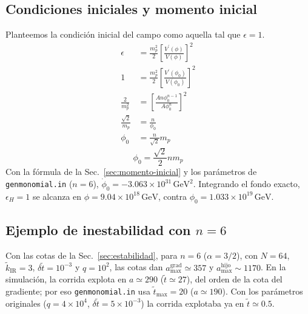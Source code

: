         \subsection{Condiciones iniciales y momento inicial}

            Planteemos la condición inicial del campo como aquella tal que $\epsilon = 1$.
            \begin{equation*}
                \begin{split}
                    \epsilon &= \frac{m_p^2}{2} \left[ \frac{V^\prime (\phi)}{V(\phi)} \right]^2\\
                    1 &= \frac{m_p^2}{2} \left[ \frac{V^\prime (\phi_0)}{V(\phi_0)} \right]^2\\
                    \frac{2}{m_p^2} &= \left[ \frac{A n \phi^{n-1}_0}{A \phi^n_0} \right]^2\\
                    \frac{\sqrt{2}}{m_p} &= \frac{n}{\phi_0}\\
                    \phi_0 &= \frac{n}{\sqrt{2}} m_p
                \end{split}
            \end{equation*}
            \begin{equation}
                \phi_0 = \frac{\sqrt{2}}{2} n m_p
            \end{equation}
            Con la fórmula de la Sec.~\ref{sec:momento-inicial} y los parámetros de \texttt{genmonomial.in} ($n = 6$), $\dot\phi_0 = -3.063 \times 10^{31}\,\text{GeV}^2$. Integrando el fondo exacto, $\epsilon_H = 1$ se alcanza en $\phi = 9.04 \times 10^{18}\,\text{GeV}$, contra $\phi_0 = 1.033 \times 10^{19}\,\text{GeV}$.

        \subsection{Ejemplo de inestabilidad con $n = 6$}

            Con las cotas de la Sec.~\ref{sec:estabilidad}, para $n = 6$ ($\alpha = 3/2$), con $N = 64$, $\tilde k_{\text{IR}} = 3$, $\delta\tilde t = 10^{-3}$ y $q = 10^2$, las cotas dan $a_{\max}^{\text{grad}} \simeq 357$ y $a_{\max}^{\text{hijo}} \sim 1170$. En la simulación, la corrida explota en $a \simeq 290$ ($\tilde t \simeq 27$), del orden de la cota del gradiente; por eso \texttt{genmonomial.in} usa $\tilde t_{\max} = 20$ ($a \simeq 190$). Con los parámetros originales ($q = 4 \times 10^4$, $\delta\tilde t = 5 \times 10^{-3}$) la corrida explotaba ya en $\tilde t \simeq 0.5$.

